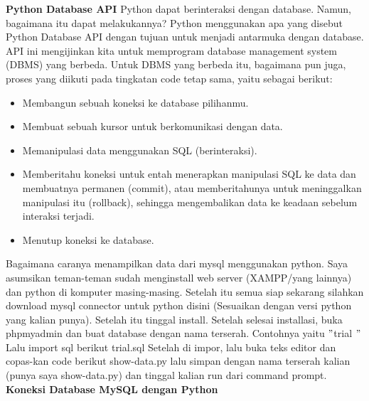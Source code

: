 \vspace{12pt}
\noindent 
\textbf{Python Database API} 
Python dapat berinteraksi dengan database. Namun, bagaimana itu dapat melakukannya? Python menggunakan apa yang disebut Python Database API dengan tujuan untuk menjadi antarmuka dengan database. API ini mengijinkan kita untuk memprogram database management system (DBMS) yang berbeda. Untuk DBMS yang berbeda itu, bagaimana pun juga, proses yang diikuti pada tingkatan code tetap sama, yaitu sebagai berikut: 
\vspace{12pt}
\noindent 
\begin{itemize}
\item Membangun sebuah koneksi ke database pilihanmu. 
\noindent 
\item Membuat sebuah kursor untuk berkomunikasi dengan data. 
\noindent 
\item Memanipulasi data menggunakan SQL (berinteraksi). 
\noindent 
\item Memberitahu koneksi untuk entah menerapkan manipulasi SQL ke data dan membuatnya permanen (commit), atau memberitahunya untuk meninggalkan manipulasi itu (rollback), sehingga mengembalikan data ke keadaan sebelum interaksi terjadi. 
\noindent 
\item Menutup koneksi ke database.\end{itemize}
Bagaimana caranya menampilkan data dari mysql menggunakan python. Saya asumsikan teman-teman sudah menginstall web server (XAMPP/yang lainnya) dan python di komputer masing-masing. Setelah itu semua siap sekarang silahkan download mysql connector untuk python disini (Sesuaikan dengan versi python yang kalian punya). Setelah itu tinggal install. 
Setelah selesai installasi, buka phpmyadmin dan buat database dengan nama terserah. Contohnya yaitu  $ " $trial $ " $ Lalu import sql berikut 
\noindent 
trial.sql 
\noindent 
Setelah di impor, lalu buka teks editor dan copas-kan code berikut 
\noindent 
show-data.py
\noindent 
lalu simpan dengan nama terserah kalian (punya saya show-data.py) dan tinggal kalian run dari command prompt.
\vspace{12pt}
\noindent 
\textbf{Koneksi Database MySQL dengan Python} 
\noindent 
